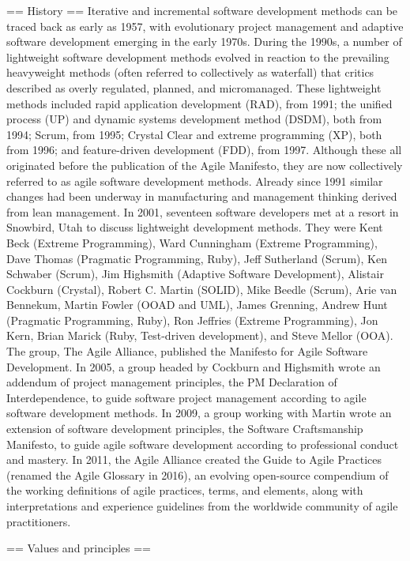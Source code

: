 == History ==
Iterative and incremental software development methods can be traced back as early as 1957, with evolutionary project management and adaptive software development emerging in the early 1970s.
During the 1990s, a number of lightweight software development methods evolved in reaction to the prevailing heavyweight methods (often referred to collectively as waterfall) that critics described as overly regulated, planned, and micromanaged. These lightweight methods included rapid application development (RAD), from 1991; the unified process (UP) and dynamic systems development method (DSDM), both from 1994; Scrum, from 1995; Crystal Clear and extreme programming (XP), both from 1996; and feature-driven development (FDD), from 1997. Although these all originated before the publication of the Agile Manifesto, they are now collectively referred to as agile software development methods.
Already since 1991 similar changes had been underway in manufacturing and management thinking derived from lean management.
In 2001, seventeen software developers met at a resort in Snowbird, Utah to discuss lightweight development methods. They were Kent Beck (Extreme Programming), Ward Cunningham (Extreme Programming), Dave Thomas (Pragmatic Programming, Ruby), Jeff Sutherland (Scrum), Ken Schwaber (Scrum), Jim Highsmith (Adaptive Software Development), Alistair Cockburn (Crystal), Robert C. Martin (SOLID), Mike Beedle (Scrum), Arie van Bennekum, Martin Fowler (OOAD and UML), James Grenning, Andrew Hunt (Pragmatic Programming, Ruby), Ron Jeffries (Extreme Programming), Jon Kern, Brian Marick (Ruby, Test-driven development), and Steve Mellor (OOA). The group, The Agile Alliance, published the Manifesto for Agile Software Development.
In 2005, a group headed by Cockburn and Highsmith wrote an addendum of project management principles, the PM Declaration of Interdependence, to guide software project management according to agile software development methods.
In 2009, a group working with Martin wrote an extension of software development principles, the Software Craftsmanship Manifesto, to guide agile software development according to professional conduct and mastery.
In 2011, the Agile Alliance created the Guide to Agile Practices (renamed the Agile Glossary in 2016), an evolving open-source compendium of the working definitions of agile practices, terms, and elements, along with interpretations and experience guidelines from the worldwide community of agile practitioners.


== Values and principles ==


